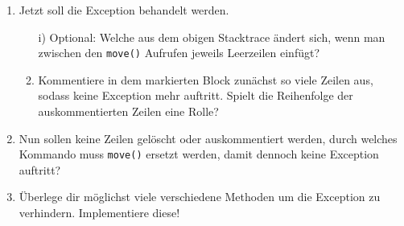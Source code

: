 \begin{enumerate}[label=\alph*)]
    \item Jetzt soll die Exception behandelt werden.
        \begin{enumerate}
            \item[i)] Optional: Welche  aus dem obigen Stacktrace ändert sich, wenn man zwischen den \lstinline{move()} Aufrufen jeweils Leerzeilen einfügt?  
            \item[ii)] Kommentiere in dem markierten Block zunächst so viele Zeilen aus, sodass keine Exception mehr auftritt. 
                Spielt die Reihenfolge der auskommentierten Zeilen eine Rolle?
        \end{enumerate}
    \item Nun sollen keine Zeilen gelöscht oder auskommentiert werden, durch welches Kommando muss \lstinline{move()} ersetzt werden, damit dennoch keine Exception auftritt?
    \item Überlege dir möglichst viele verschiedene Methoden um die Exception zu verhindern. Implementiere diese!
\end{enumerate}
 

